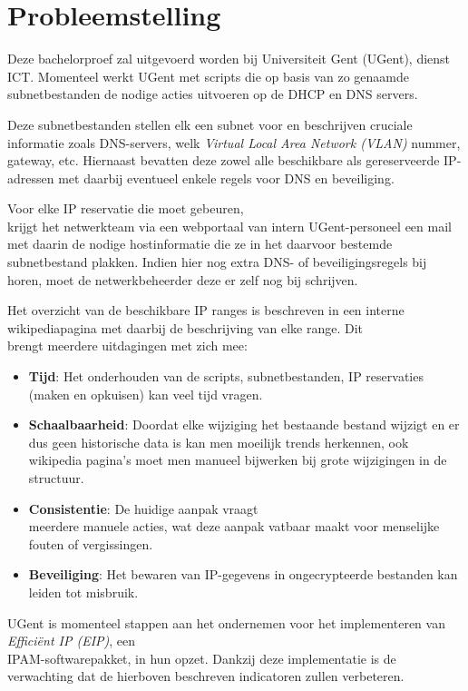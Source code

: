 \documentclass{hogent-article}
\begin{document}
\section{Probleemstelling}
\label{sec:probleemstelling}
Deze bachelorproef zal uitgevoerd worden bij Universiteit Gent (UGent), dienst ICT. Momenteel werkt UGent met scripts die op basis van zo genaamde subnetbestanden de nodige acties uitvoeren op de DHCP en DNS servers. 

Deze subnetbestanden stellen elk een subnet voor en beschrijven cruciale informatie zoals DNS-servers, welk \textit{Virtual Local Area Network (VLAN)} nummer, gateway, etc. Hiernaast bevatten deze zowel alle beschikbare als gereserveerde IP-adressen met daarbij eventueel enkele regels voor DNS en beveiliging.

Voor elke IP reservatie die moet gebeuren, \\krijgt het netwerkteam via een webportaal van intern UGent-personeel een mail met daarin de nodige hostinformatie die ze in het daarvoor bestemde subnetbestand plakken. Indien hier nog extra DNS- of beveiligingsregels bij horen, moet de netwerkbeheerder deze er zelf nog bij schrijven.

Het overzicht van de beschikbare IP ranges is beschreven in een interne wikipediapagina met daarbij de beschrijving van elke range. Dit \\brengt meerdere uitdagingen met zich mee:
\begin{itemize}
    \item \textbf{Tijd}: Het onderhouden van de scripts, subnetbestanden, IP reservaties (maken en opkuisen) kan veel tijd vragen.
    \item \textbf{Schaalbaarheid}: Doordat elke wijziging het bestaande bestand wijzigt en er dus geen historische data is kan men moeilijk trends herkennen, ook wikipedia pagina's moet men manueel bijwerken bij grote wijzigingen in de structuur.
    \item \textbf{Consistentie}: De huidige aanpak vraagt \\meerdere manuele acties, wat deze aanpak vatbaar maakt voor menselijke fouten of vergissingen.  
    \item \textbf{Beveiliging}: Het bewaren van IP-gegevens in ongecrypteerde bestanden kan leiden tot misbruik.
\end{itemize}

UGent is momenteel stappen aan het ondernemen voor het implementeren van \textit{Efficiënt IP (EIP)}, een \\IPAM-softwarepakket, in hun opzet. Dankzij deze implementatie is de verwachting dat de hierboven beschreven indicatoren zullen verbeteren.
\end{document}
